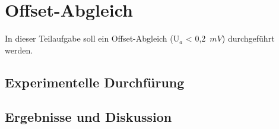 \section{Offset-Abgleich}
In dieser Teilaufgabe soll ein Offset-Abgleich (U$_a$ < 0,2~$mV$) durchgef\"uhrt werden.
\subsection{Experimentelle Durchf\"urung}

\subsection{Ergebnisse und Diskussion}
